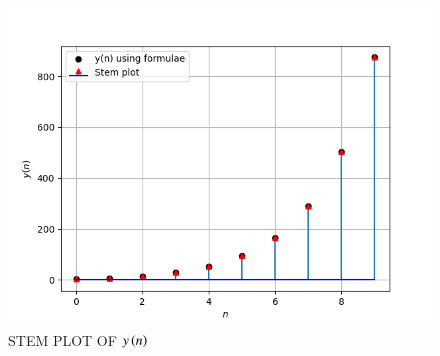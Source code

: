 \documentclass[a4,12pt,onecolumn]{IEEEtran}
\begin{document}
\begin{figure}[ht!]
\includegraphics[width=\columnwidth]{ncert-maths/11/9/3/8/figs/Figure_1.png}
\caption{\large{STEM PLOT OF $y\left(n\right)$}}
\end{figure}
\end{document}

